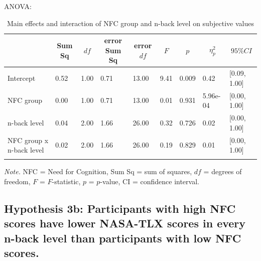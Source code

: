 \documentclass[
  man,floatsintext]{apa6}
\begin{document}
ANOVA:

\begin{table}[H]

\begin{center}
\begin{threeparttable}

\caption{\label{tab:unnamed-chunk-10}Main effects and interaction of NFC group and n-back level on subjective values}

\footnotesize{

\begin{tabular}{lllllllll}
\toprule
 & \multicolumn{1}{c}{Sum Sq} & \multicolumn{1}{c}{$df$} & \multicolumn{1}{c}{error Sum Sq} & \multicolumn{1}{c}{error $df$} & \multicolumn{1}{c}{$F$} & \multicolumn{1}{c}{$p$} & \multicolumn{1}{c}{$\eta_{p}^{2}$} & \multicolumn{1}{c}{$95\% CI$}\\
\midrule
Intercept & 0.52 & 1.00 & 0.71 & 13.00 & 9.41 & 0.009 & 0.42 & {}[0.09, 1.00]\\
NFC group & 0.00 & 1.00 & 0.71 & 13.00 & 0.01 & 0.931 & 5.96e-04 & {}[0.00, 1.00]\\
n-back level & 0.04 & 2.00 & 1.66 & 26.00 & 0.32 & 0.726 & 0.02 & {}[0.00, 1.00]\\
NFC group x n-back level & 0.02 & 2.00 & 1.66 & 26.00 & 0.19 & 0.829 & 0.01 & {}[0.00, 1.00]\\
\bottomrule
\addlinespace
\end{tabular}

}

\begin{tablenotes}[para]
\normalsize{\textit{Note.} NFC = Need for Cognition, Sum Sq = sum of squares, $df$ = degrees of freedom, $F$ = $F$-statistic, $p$ = $p$-value, CI = confidence interval.}
\end{tablenotes}

\end{threeparttable}
\end{center}

\end{table}

\newpage

\hypertarget{hypothesis-3b-participants-with-high-nfc-scores-have-lower-nasa-tlx-scores-in-every-n-back-level-than-participants-with-low-nfc-scores.}{%
\subsection{Hypothesis 3b: Participants with high NFC scores have lower NASA-TLX scores in every n-back level than participants with low NFC scores.}\label{hypothesis-3b-participants-with-high-nfc-scores-have-lower-nasa-tlx-scores-in-every-n-back-level-than-participants-with-low-nfc-scores.}}
\end{document}
